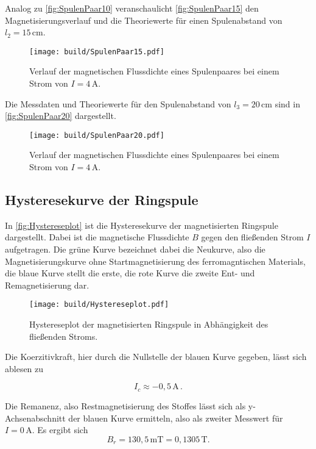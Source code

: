   Analog zu \autoref{fig:SpulenPaar10} veranschaulicht \autoref{fig:SpulenPaar15} den Magnetisierungsverlauf und die Theoriewerte
  für einen Spulenabstand von $l_2=15\, \unit{\centi\meter}$.
  \begin{figure}[H]
    \centering
    \texttt{[image: build/SpulenPaar15.pdf]}
    \caption{Verlauf der magnetischen Flussdichte eines Spulenpaares bei einem Strom von $I= 4 \, \unit{\ampere}$.}
    \label{fig:SpulenPaar15}
  \end{figure}

  Die Messdaten und Theoriewerte für den Spulenabstand von $l_3=20\, \unit{\centi\meter}$ sind in 
  \autoref{fig:SpulenPaar20} dargestellt.
  \begin{figure}[H]
    \centering
    \texttt{[image: build/SpulenPaar20.pdf]}
    \caption{Verlauf der magnetischen Flussdichte eines Spulenpaares bei einem Strom von $I= 4 \, \unit{\ampere}$.}
    \label{fig:SpulenPaar20}
  \end{figure}

\newpage

\subsection{Hysteresekurve der Ringspule}

In \autoref{fig:Hystereseplot} ist die Hysteresekurve der magnetisierten Ringspule dargestellt. Dabei ist die magnetische
Flussdichte $B$ gegen den fließenden Strom $I$ aufgetragen. Die grüne Kurve bezeichnet dabei die Neukurve, also die Magnetisierungskurve
ohne Startmagnetisierung des ferromagntischen Materials, die blaue Kurve stellt die erste, die rote Kurve die zweite Ent- und Remagnetisierung dar.

\begin{figure}[H]
    \centering
    \texttt{[image: build/Hystereseplot.pdf]}
    \caption{Hystereseplot der magnetisierten Ringspule in Abhängigkeit des fließenden Stroms.}
    \label{fig:Hystereseplot}
  \end{figure}

  Die Koerzitivkraft, hier durch die Nullstelle der blauen Kurve gegeben, lässt sich ablesen zu

  \begin{equation*}
    I_c \approx -0,5 \, \unit{\ampere} \,.
  \end{equation*}

  Die Remanenz, also Restmagnetisierung des Stoffes lässt sich als y-Achsenabschnitt der blauen Kurve ermitteln, also
  als zweiter Messwert für $I=0 \, \unit{\ampere}$.
  Es ergibt sich
  \begin{equation*}
    B_r = 130,5 \, \unit{\milli\tesla} = 0,1305 \, \unit{\tesla}. 
  \end{equation*}
